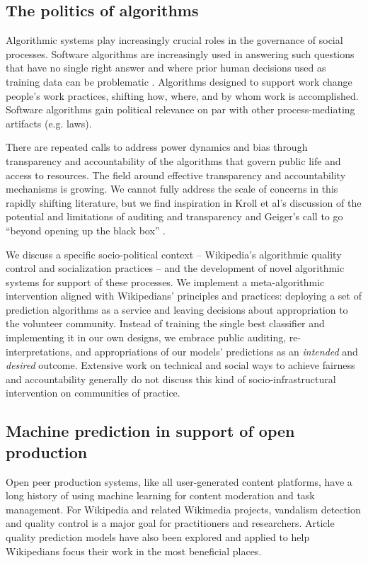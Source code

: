 \subsection{The politics of algorithms}
Algorithmic systems play increasingly crucial roles in the governance of social processes\cite{gillespie2014relevance}.  Software algorithms are increasingly used in answering such questions that have no single right answer and where prior human decisions used as training data can be problematic \cite{barocas2013governing,tufekci2015algorithms}. Algorithms designed to support work change people's work practices, shifting how, where, and by whom work is accomplished\cite{crawford2016algorithm, gillespie2014relevance, zuboff1988age}.  Software algorithms gain political relevance on par with other process-mediating artifacts (e.g. laws\cite{lessig1999code}).

There are repeated calls to address power dynamics and bias through transparency and accountability of the algorithms that govern public life and access to resources\cite{diakopoulos2017algorithmic,sandvig2014auditing}.  The field around effective transparency and accountability mechanisms is growing.  We cannot fully address the scale of concerns in this rapidly shifting literature, but we find inspiration in Kroll et al's discussion of the potential and limitations of auditing and transparency\cite{kroll2016accountable} and Geiger's call to go ``beyond opening up the black box'' \cite{geiger2017beyond}.

We discuss a specific socio-political context -- Wikipedia's algorithmic quality control and socialization practices -- and the development of novel algorithmic systems for support of these processes.  We implement a meta-algorithmic intervention aligned with Wikipedians' principles and practices: deploying a set of prediction algorithms as a service and leaving decisions about appropriation to the volunteer community.  Instead of training the single best classifier and implementing it in our own designs, we embrace public auditing, re-interpretations, and appropriations of our models' predictions as an \emph{intended} and \emph{desired} outcome.  Extensive work on technical and social ways to achieve fairness and accountability generally do not discuss this kind of socio-infrastructural intervention on communities of practice.

\subsection{Machine prediction in support of open production}
Open peer production systems, like all user-generated content platforms, have a long history of using machine learning for content moderation and task management. For Wikipedia and related Wikimedia projects, vandalism detection and quality control is a major goal for practitioners and researchers.  Article quality prediction models have also been explored and applied to help Wikipedians focus their work in the most beneficial places.

